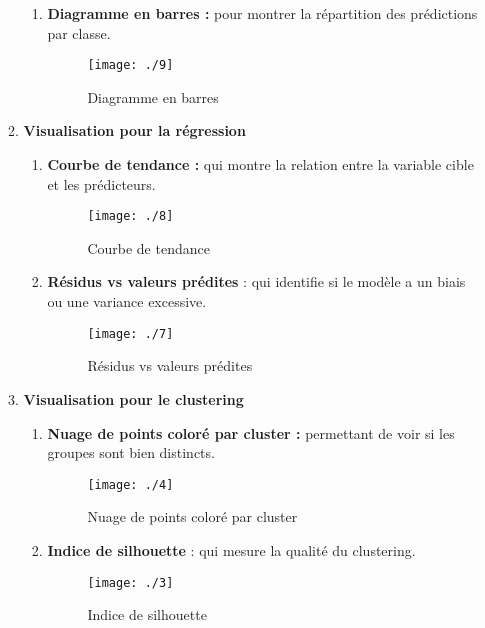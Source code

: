 \documentclass[a4paper, 12pt]{article}
\begin{document}
\begin{enumerate}
\begin{enumerate}
\begin{enumerate}
			\item \justifying \textbf{Diagramme en barres :} pour  montrer la répartition des prédictions par classe.
			\begin{figure}[h]
				\centering
				\texttt{[image: ./9]}
				\caption{Diagramme en barres }
			\end{figure}
			
			\end{enumerate}\newpage
			\item \justifying \textbf{
				Visualisation pour la régression
			}\\
			\begin{enumerate}
				\item \justifying \textbf{Courbe de tendance :} qui montre la relation entre la variable cible et les prédicteurs.
				\begin{figure}[h]
					\centering
					\texttt{[image: ./8]}
					\caption{Courbe de tendance}
				\end{figure} 
				
				\item \justifying \textbf{Résidus vs valeurs prédites} : qui identifie si le modèle a un biais ou une variance excessive.
				\begin{figure}[h]
					\centering
					\texttt{[image: ./7]}
					\caption{Résidus vs valeurs prédites  }
				\end{figure} 
			\end{enumerate}
			\item \justifying \textbf{Visualisation pour le clustering}\\
			\begin{enumerate}
				\item \justifying \textbf{Nuage de points coloré par cluster :} permettant de voir si les groupes sont bien distincts.
				\begin{figure}[h]
				\centering
				\texttt{[image: ./4]}
				\caption{Nuage de points coloré par cluster }
				\end{figure} \newpage
				\item \justifying \textbf{Indice de silhouette }: qui mesure la qualité du clustering.
				\begin{figure}[h]
				\centering
				\texttt{[image: ./3]}
				\caption{Indice de silhouette  }
				\end{figure} 
			
		\end{enumerate}
			 

\end{enumerate}
\end{enumerate}
\end{document}
